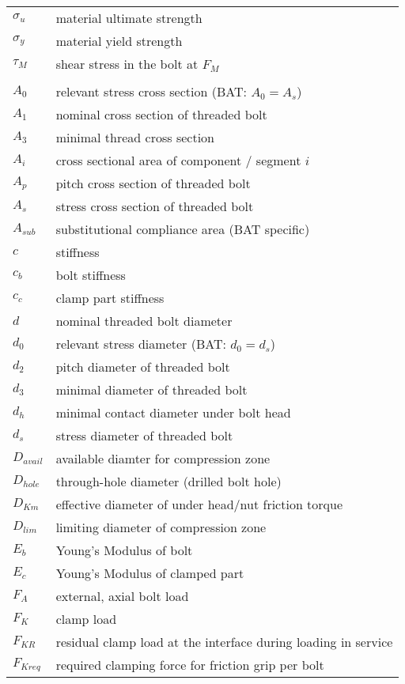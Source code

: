 \begin{longtable}{p{2cm} l}
  $\sigma_u$ & material ultimate strength \\
  $\sigma_y$ & material yield strength \\
  $\tau_M$ & shear stress in the bolt at $F_M$\\
  & \\
  $A_0$ & relevant stress cross section (BAT: $A_0 = A_s$) \\
  $A_1$ & nominal cross section of threaded bolt \\
  $A_3$ & minimal thread cross section \\
  $A_i$ & cross sectional area of component / segment $i$ \\
  $A_p$ & pitch cross section of threaded bolt \\
  $A_s$ & stress cross section of threaded bolt \\
  $A_{sub}$ & substitutional compliance area (BAT specific) \\
  $c$ & stiffness \\
  $c_b$ & bolt stiffness \\
  $c_c$ & clamp part stiffness \\
  $d$ & nominal threaded bolt diameter \\
  $d_0$ & relevant stress diameter (BAT: $d_0=d_s$) \\
  $d_2$ & pitch diameter of threaded bolt \\
  $d_3$ & minimal diameter of threaded bolt \\
  $d_h$ & minimal contact diameter under bolt head \\
  $d_s$ & stress diameter of threaded bolt \\
  $D_{avail}$ & available diamter for compression zone \\
  $D_{hole}$ & through-hole diameter (drilled bolt hole) \\
  $D_{Km}$ & effective diameter of under head/nut friction torque \\
  $D_{lim}$ & limiting diameter of compression zone \\
  $E_b$ & Young's Modulus of bolt \\
  $E_c$ & Young's Modulus of clamped part \\
  $F_A$ & external, axial bolt load \\
  $F_K$ & clamp load \\
  $F_{KR}$ & residual clamp load at the interface during loading in service \\
  $F_{Kreq}$ & required clamping force for friction grip per bolt \\

\end{longtable}
